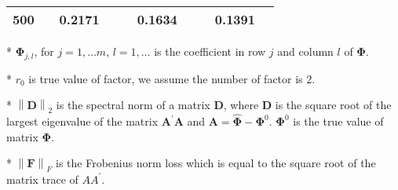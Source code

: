\documentclass[12pt,a4paper,hyperref]{article}
\begin{document}
\begin{table}[H]
\begin{threeparttable}
\begin{tabular} {*{10}{c}}
500& & 0.2171& &  & 0.1634& & & 0.1391& \\
\bottomrule
\end{tabular}
\begin{tablenotes}
\footnotesize
  \item[*] $\boldsymbol{\Phi}_{j,l}$, for $j=1,\ldots m$, $l=1,\ldots$ is the coefficient in row $j$ and column $l$ of $\boldsymbol{\Phi}$.
\item[*] $r_{0}$ is true value of factor, we assume the number of factor is $2$.
 \item[*] $\left\| \boldsymbol{D} \right\|_{2}$ is the spectral norm of a matrix $\boldsymbol{D}$, where $\boldsymbol{D}$ is the square root of the largest eigenvalue of the matrix $\boldsymbol{A}^{'}\boldsymbol{A}$ and $\boldsymbol{A}=\hat{\boldsymbol{\Phi}}- \boldsymbol{\Phi}^{0}$. $\boldsymbol{\Phi}^{0}$ is the true value of matrix $\boldsymbol{\Phi}$.
 \item[*] $\left\| \boldsymbol{F} \right\|_{F} $ is the Frobenius norm loss which is equal to the square root of the matrix trace of $AA^{'}$.
    \end{tablenotes}
\end{threeparttable}
\end{table}
\end{document}
